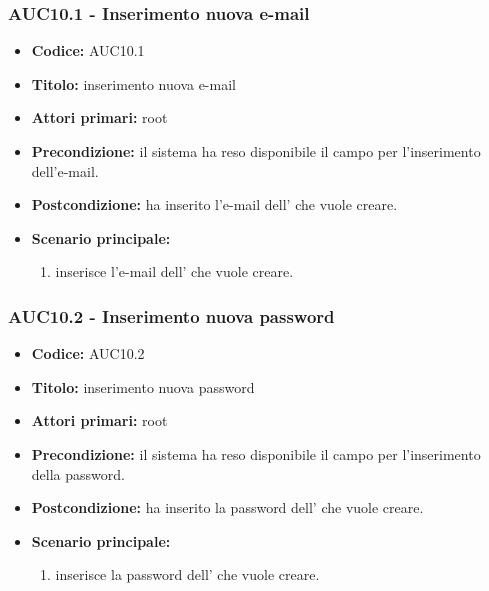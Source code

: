 \documentclass[casi-duso]{subfiles}
\begin{document}
\subsubsection{AUC10.1 - Inserimento nuova e-mail}
\label{subsub:AUC10.1}
\begin{itemize}
  \item \textbf{Codice:} AUC10.1
  \item \textbf{Titolo:} inserimento nuova e-mail
  \item \textbf{Attori primari:} root
  \item \textbf{Precondizione:} il sistema ha reso disponibile il campo per l'inserimento dell'e-mail.
  \item \textbf{Postcondizione:}  ha inserito l'e-mail dell' che vuole creare.
  \item \textbf{Scenario principale:}
  \begin{enumerate}
    \item {} inserisce l'e-mail dell' che vuole creare.
  \end{enumerate}
\end{itemize}

\subsubsection{AUC10.2 - Inserimento nuova password}
\label{subsub:AUC10.2}
\begin{itemize}
  \item \textbf{Codice:} AUC10.2
  \item \textbf{Titolo:} inserimento nuova password
  \item \textbf{Attori primari:} root
  \item \textbf{Precondizione:} il sistema ha reso disponibile il campo per l'inserimento della password.
  \item \textbf{Postcondizione:}  ha inserito la password dell' che vuole creare.
  \item \textbf{Scenario principale:}
  \begin{enumerate}
    \item {} inserisce la password dell' che vuole creare.
  \end{enumerate}
\end{itemize}
\end{document}
